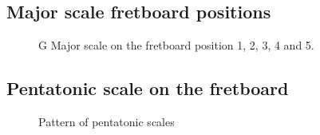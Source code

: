 \documentclass{article}
\begin{document}



\clearpage
\subsection{Major scale fretboard positions}

\begin{figure}[h!]
	\centering
	\hspace*{-2cm}
	\scalebox{0.5}{}
	\hspace*{-2cm}
	\scalebox{0.5}{}
	\hspace*{-2cm}
	\scalebox{0.5}{}
	\hspace*{-2cm}
	\scalebox{0.5}{}
	\hspace*{-2cm}
	\scalebox{0.5}{}
	\caption{G Major scale on the fretboard position 1, 2, 3, 4 and 5.}
	\label{fig:gamme_majeure_manche}
\end{figure}

\clearpage
\subsection{Pentatonic scale on the fretboard}

\begin{figure}[h!]
	\centering
	\hspace*{-2cm}
	\scalebox{0.5}{}
	\hspace*{-2cm}
	\scalebox{0.5}{}
	\hspace*{-2cm}
	\scalebox{0.5}{}
	\hspace*{-2cm}
	\scalebox{0.5}{}
	\hspace*{-2cm}
	\scalebox{0.5}{}
	\caption{Pattern of pentatonic scales}
	\label{fig:gammme_penta_manche}
\end{figure}
\end{document}
